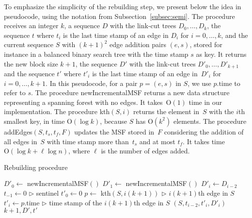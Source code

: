 \documentclass[reqno,11pt]{amsart}
\newcommand{\Oh}{\mathrm{O}}
\begin{document}
\medskip

To emphasize the simplicity of the rebuilding step, we present below 
the idea in pseudocode, using the notation from Subsection~\ref{subsec:semi}.
The procedure receives an integer $k$, a sequence $D$ with the link-cut trees $D_0,\ldots,D_k$, 
the sequence $t$ where $t_i$ is the last time stamp of an edge in $D_i$ for $i=0,\ldots,k$, and
the current sequence $S$ with $(k+1)^2$ edge addition pairs $(e,s)$, stored 
for instance in a balanced binary search tree with the time stamp $s$ as key.
It returns the new block size $k+1$, the sequence $D'$ with 
the link-cut trees $D'_0,\ldots,D'_{k+1}$ and the sequence $t'$ 
where $t'_i$ is the last time stamp of an edge in~$D'_i$ for $i=0,\ldots,k+1$. 
In this pseudocode, for a pair $p=(e,s)$ in $S$, we use 
$p.\textrm{time}$ to refer to $s$. %
The procedure {\sc newIncrementalMSF} returns 
a new data structure representing a spanning forest with no edges. 
It takes~$\Oh(1)$ time in our implementation. 
The procedure {\sc kth}$(S,i)$ returns the element in~$S$ with the $i$th smallest key, 
in time $\Oh(\log k)$, because $S$ has $\Oh(k^2)$ elements. 
The procedure {\sc addEdges}$(S,t_s,t_f,F)$ updates the MSF stored in~$F$ 
considering the addition of all edges in~$S$ with time stamp more than~$t_s$ 
and at most $t_f$.
It takes time $\Oh(\log k + \ell\log n)$, where $\ell$ is the number of edges added.

\medskip

\begin{algorithm}[h!]
    \caption{Rebuilding procedure}\label{rmsf-build-decomp}
    \begin{algorithmic}[1]
        \State $D'_0 \gets$ {\sc newIncrementalMSF}$()$
        \State $D'_1 \gets$ {\sc newIncrementalMSF}$()$
        \State $D'_i \gets D_{i-2}$
        \EndFor
        \State $t_{-1} \gets 0$ \hfill {\footnotesize $\rhd$ sentinel}
        \State $t'_0 \gets 0$ 
        \State $p \gets$ {\sc kth}$(S,i(k+1))$ \hfill {\footnotesize $\rhd$ $i(k+1)$th edge in $S$}
        \State $t'_i \gets p.\textrm{time}$ \hfill {\footnotesize $\rhd$ time stamp of the $i(k+1)$th edge in $S$}
        $(S,t_{i-2},t'_i,D'_i)$
        \EndFor
        \State \Return $k+1,D',t'$
        \EndFunction
    \end{algorithmic}
\end{algorithm}
\end{document}
